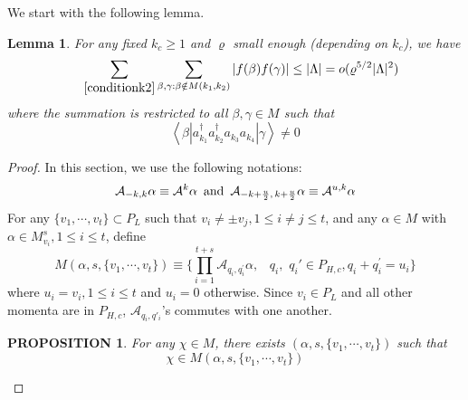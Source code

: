 \documentclass[11pt]{article}
\numberwithin{equation}{section}
\newcommand{\beq}{\begin{equation}}
\newcommand{\eeq}{\end{equation}}
\newcommand{\beqa}{\begin{eqnarray}}
\newcommand{\eeqa}{\end{eqnarray}}
\newcommand\rmand{ \,\,\,{\rm and}\,\,\, }
\newcommand\al{{\alpha}}
\newcommand\be{\beta}
\renewcommand\rho\varrho
\newtheorem{prop}{PROPOSITION}[section]
\newtheorem{lem}{Lemma}[section]
\theoremstyle{definition}
\begin{document}
We start with the following lemma.
\begin{lem}\label{thehardestlemma}
For any fixed $k_c\geq 1$ and $\rho$ small enough (depending on $k_c$), we have
\beqa\label{resulthardest}
&&\sum_{\eqref{conditionk2}}\sum_{\be, \gamma: \beta \notin M(k_1,k_2)}\left|f(\be)f(\gamma)\right|  \leq |\Lambda|= o(\rho^{5/2}|\Lambda|^2)
\eeqa
where  the summation is restricted to all $\beta, \gamma\in M$ such that 
\beq\label{defnastk1234}
\left\langle\be| a^\dagger_{k_1}a^\dagger_{k_2}a_{k_3}a_{k_4}|\gamma\right\rangle\neq 0
\eeq
\end{lem}


\begin{proof}  In this section, we use the following notations: 
\beq
\mathcal A_{-k, k}\al\equiv \mathcal A^k \al\rmand \mathcal A_{-k+\frac u2,\,k+\frac u2}\al\equiv\mathcal A^{u,k}\al
\eeq
For any $\{v_1,\cdots, v_t\}\subset P_L$ such that  $v_i\neq \pm v_j, 1\leq i\neq j\leq t$, and any $\al\in M$ with $\al\in M_{v_i}^s, 1\leq i\leq t$,  define 
\beq\label{elementform2}
 M(\al,s,\{v_1,\cdots,v_t\})\equiv \{\prod_{i=1}^{t+s}\mathcal A_{q_{i}, q^{'}_{i}}\al,\,\,\,\,\,q_i,\,\,q_i'\in P_{H,c}, q_{i}+ q^{'}_{i}= u_{i}\}
\eeq
where  $u_i = v_{i}, 1\le i \le t$ and $u_{i} = 0$ otherwise. Since $v_{i}\in P_{L}$ and 
all other momenta are in $P_{H, c}$, $\mathcal A_{q_{i}, q'_{i}}$'s commutes with one another. 

\begin{prop}\label{propchi}
For any  $\chi\in M$, there exists $(\al,s,\{v_1,\cdots,v_t\})$ such that 
\beq\label{resultbegaM}
\chi\in M(\al,s,\{v_1,\cdots,v_t\})
\eeq
\end{prop}


\end{proof}
\end{document}
